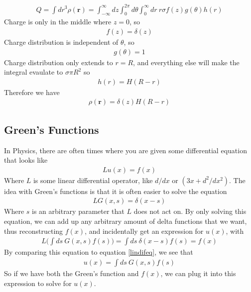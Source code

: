 \begin{align}
Q = \int dr^3 \rho(\textbf{r}) = \int_{-\infty}^\infty dz \int_0^{2\pi} d\theta \int_0^\infty dr~r \sigma f(z)g(\theta)h(r)
\end{align}
Charge is only in the middle where $z=0$, so
\begin{align}
f(z) = \delta(z)
\end{align}
Charge distribution is independent of $\theta$, so
\begin{align}
g(\theta) = 1
\end{align}
Charge distribution only extends to $r=R$, and everything else will make the integral evaulate to $\sigma\pi R^2$ so
\begin{align}
h(r) = H(R-r)
\end{align}
Therefore we have
\begin{align}
\rho(\textbf{r}) = \delta(z)H(R-r)
\end{align}





\subsection{Green's Functions}\label{green}
In Physics, there are often times where you are given some differential equation that looks like
\begin{align}\label{lindifeq}
L u(x) = f(x)
\end{align}
Where $L$ is some linear differential operator, like $d/dx$ or $(3x+d^2/dx^2)$. The idea with Green's functions is that it is often easier to solve the equation
\begin{align}
L G(x,s) = \delta(x-s)
\end{align}
Where $s$ is an arbitrary parameter that $L$ does not act on. By only solving this equation, we can add up any arbitrary amount of delta functions that we want, thus reconstructing $f(x)$, and incidentally get an expression for $u(x)$, with
\begin{align}
L\Big(\int ds~G(x,s)f(s)\Big) = \int ds~\delta(x-s) f(s) = f(x)
\end{align}
By comparing this equation to equation \ref{lindifeq}, we see that
\begin{align}
u(x) = \int ds~G(x,s)f(s)
\end{align}
So if we have both the Green's function and $f(x)$, we can plug it into this expression to solve for $u(x)$. %




